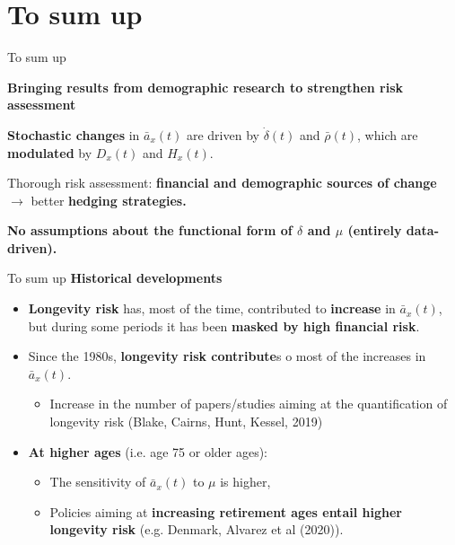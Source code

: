 \documentclass[10pt]{beamer}
\begin{document}
\section{To sum up}

\begin{frame}{To sum up}

\textbf{Bringing results from demographic research to strengthen risk assessment} \pause
\begin{center}
	\pause
\end{center}
\textbf{Stochastic changes} in $\bar{a}_x(t)$ are driven by $\dot{\delta}(t)$ and $\bar{\rho}(t)$, which are \textbf{modulated} by  ${D}_x(t)$ and ${H}_x(t)$. \pause


Thorough risk assessment: \textbf{financial and demographic sources of change}\\ $\rightarrow$ better \textbf{hedging strategies.} \pause

\textbf{No assumptions about the functional form of $\delta$ and $\mu$ (entirely data-driven).}



\end{frame}




\begin{frame}{To sum up}
\textbf{Historical developments}
\begin{itemize}
	\item \textbf{Longevity risk} has, most of the time, contributed to \textbf{increase} in $\bar{a}_x(t)$, but during some periods it has been \textbf{masked by high financial risk}. \pause
	\item Since the 1980s, \textbf{longevity risk contribute}s o most of the increases in $\bar{a}_x(t)$. \pause
	\begin{itemize}
		\item Increase in the number of papers/studies aiming at the quantification of longevity risk {\scriptsize (Blake, Cairns, Hunt, Kessel, 2019)} \pause
	\end{itemize}
	\item \textbf{At higher ages} (i.e. age 75 or older ages): \pause
	\begin{itemize}
		\item The sensitivity of $\bar{a}_x(t)$ to $\mu$ is higher, \pause
		\item Policies aiming at \textbf{increasing retirement ages entail higher longevity risk} (e.g. Denmark, Alvarez et al (2020)).
\end{itemize}
\end{itemize}
\end{frame}
\end{document}
